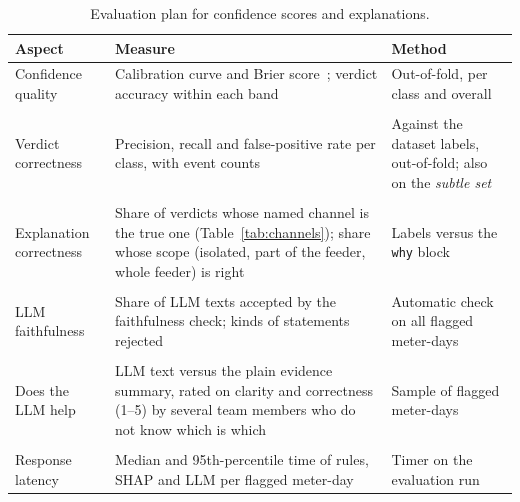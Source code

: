 \documentclass[11pt,a4paper]{article}
\begin{document}
\begin{table}[H]
\centering
\small
\begin{tabularx}{\textwidth}{@{}>{\raggedright\arraybackslash}p{3.1cm}LL@{}}
\toprule
\textbf{Aspect} & \textbf{Measure} & \textbf{Method} \\
\midrule
Confidence quality & Calibration curve and Brier score~\cite{trustcalpage}; verdict accuracy within each band & Out-of-fold, per class and overall \\ \\
Verdict correctness & Precision, recall and false-positive rate per class, with event counts & Against the dataset labels, out-of-fold; also on the \emph{subtle set} \\ \\
Explanation correctness & Share of verdicts whose named channel is the true one (Table~\ref{tab:channels}); share whose scope (isolated, part of the feeder, whole feeder) is right & Labels versus the \texttt{why} block \\ \\
LLM faithfulness & Share of LLM texts accepted by the faithfulness check; kinds of statements rejected & Automatic check on all flagged meter-days \\ \\
Does the LLM help & LLM text versus the plain evidence summary, rated on clarity and correctness (1--5) by several team members who do not know which is which & Sample of flagged meter-days \\ \\
Response latency & Median and 95th-percentile time of rules, SHAP and LLM per flagged meter-day & Timer on the evaluation run \\
\bottomrule
\end{tabularx}
\caption{Evaluation plan for confidence scores and explanations.}
\label{tab:evalplan}
\end{table}
\end{document}
